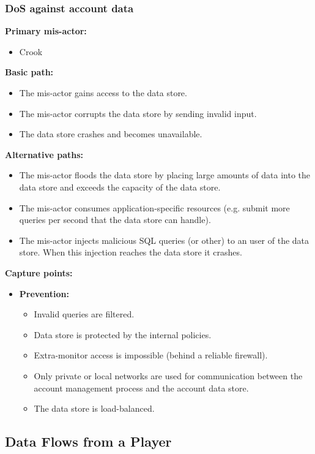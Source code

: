 \documentclass[a4paper,11pt]{report}
\begin{document}
\subsubsection{DoS against account data}
\label{AccountDataCasesD}
\textbf{Primary mis-actor:}
\begin{itemize}
\item Crook
\end{itemize}
\textbf{Basic path:}
\begin{itemize}
\item The mis-actor gains access to the data store.
\item The mis-actor corrupts the data store by sending invalid input.
\item The data store crashes and becomes unavailable.
\end{itemize}
\textbf{Alternative paths:}
\begin{itemize}
\item The mis-actor floods the data store by placing large amounts of data into the data store and exceeds the
capacity of the data store.
\item The mis-actor consumes application-specific resources (e.g. submit more queries per second that the data
store can handle).
\item The mis-actor injects malicious SQL queries (or other) to an user of the data store. When this injection reaches the data store it crashes.
\end{itemize}
\textbf{Capture points:}
\begin{itemize}
\item \textbf{Prevention:}
\begin{itemize}
\item Invalid queries are filtered.
\item Data store is protected by the internal policies.
\item Extra-monitor access is impossible (behind a reliable firewall).
\item Only private or local networks are used for communication between the account management process
and the account data store.
\item The data store is load-balanced.
\end{itemize}
\end{itemize}

\subsection{Data Flows from a Player}
\label{PlayerFlowCases}
\end{document}
